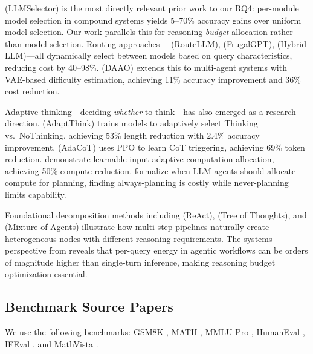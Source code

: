 \documentclass[11pt]{article}
\begin{document}
\citet{chen2025llmselector} (LLMSelector) is the most directly relevant prior work to our RQ4: per-module model selection in compound systems yields 5--70\% accuracy gains over uniform model selection. Our work parallels this for reasoning \emph{budget} allocation rather than model selection. Routing approaches---\citet{ong2024routellm} (RouteLLM), \citet{chen2023frugalgpt} (FrugalGPT), \citet{ding2024hybrid} (Hybrid LLM)---all dynamically select between models based on query characteristics, reducing cost by 40--98\%. \citet{su2025daao} (DAAO) extends this to multi-agent systems with VAE-based difficulty estimation, achieving 11\% accuracy improvement and 36\% cost reduction.

Adaptive thinking---deciding \emph{whether} to think---has also emerged as a research direction. \citet{zhang2025adaptthink} (AdaptThink) trains models to adaptively select Thinking vs.\ NoThinking, achieving 53\% length reduction with 2.4\% accuracy improvement. \citet{lou2025adacot} (AdaCoT) uses PPO to learn CoT triggering, achieving 69\% token reduction. \citet{damani2024learning} demonstrate learnable input-adaptive computation allocation, achieving 50\% compute reduction. \citet{paglieri2025whentoplan} formalize when LLM agents should allocate compute for planning, finding always-planning is costly while never-planning limits capability.

Foundational decomposition methods including \citet{yao2022react} (ReAct), \citet{yao2023tot} (Tree of Thoughts), and \citet{wang2024moa} (Mixture-of-Agents) illustrate how multi-step pipelines naturally create heterogeneous nodes with different reasoning requirements. The systems perspective from \citet{kim2026hpca} reveals that per-query energy in agentic workflows can be orders of magnitude higher than single-turn inference, making reasoning budget optimization essential.

\subsection{Benchmark Source Papers}

We use the following benchmarks: GSM8K \citep{cobbe2021gsm8k}, MATH \citep{hendrycks2021math}, MMLU-Pro \citep{wang2024mmlupro}, HumanEval \citep{chen2021humaneval}, IFEval \citep{zhou2023ifeval}, and MathVista \citep{lu2024mathvista}.

\end{document}
